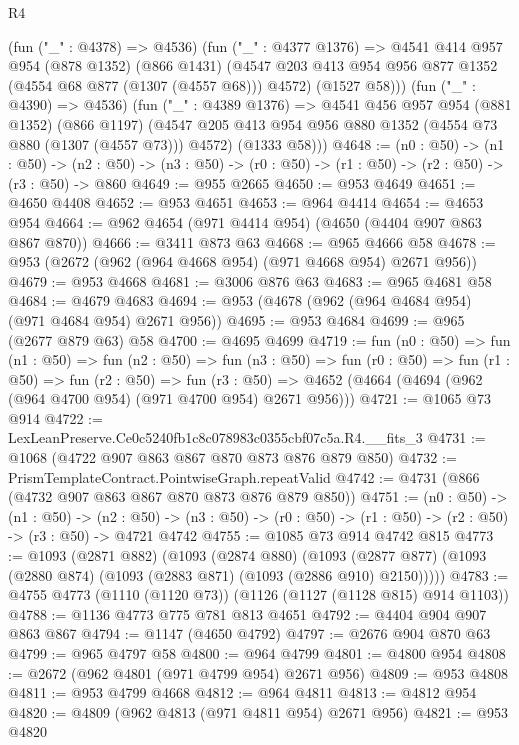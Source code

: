 \begin{lexlean}{R4}
\begin{coremodule}
        (fun ("_" : @4378) => @4536)
        (fun ("_" : @4377 @1376) =>
        @4541
          @414
          @957
          @954
          (@878 @1352)
          (@866 @1431)
          (@4547 @203 @413 @954 @956 @877 @1352 (@4554 @68 @877 (@1307 (@4557 @68))) @4572)
          (@1527 @58)))
      (fun ("_" : @4390) => @4536)
      (fun ("_" : @4389 @1376) =>
      @4541
        @456
        @957
        @954
        (@881 @1352)
        (@866 @1197)
        (@4547 @205 @413 @954 @956 @880 @1352 (@4554 @73 @880 (@1307 (@4557 @73))) @4572)
        (@1333 @58)))
@4648 := (n0 : @50) ->
  (n1 : @50) ->
  (n2 : @50) -> (n3 : @50) -> (r0 : @50) -> (r1 : @50) -> (r2 : @50) -> (r3 : @50) -> @860
@4649 := @955 @2665
@4650 := @953 @4649
@4651 := @4650 @4408
@4652 := @953 @4651
@4653 := @964 @4414
@4654 := @4653 @954
@4664 := @962 @4654 (@971 @4414 @954) (@4650 (@4404 @907 @863 @867 @870))
@4666 := @3411 @873 @63
@4668 := @965 @4666 @58
@4678 := @953 (@2672 (@962 (@964 @4668 @954) (@971 @4668 @954) @2671 @956))
@4679 := @953 @4668
@4681 := @3006 @876 @63
@4683 := @965 @4681 @58
@4684 := @4679 @4683
@4694 := @953 (@4678 (@962 (@964 @4684 @954) (@971 @4684 @954) @2671 @956))
@4695 := @953 @4684
@4699 := @965 (@2677 @879 @63) @58
@4700 := @4695 @4699
@4719 := fun (n0 : @50) =>
  fun (n1 : @50) =>
  fun (n2 : @50) =>
  fun (n3 : @50) =>
  fun (r0 : @50) =>
  fun (r1 : @50) =>
  fun (r2 : @50) =>
  fun (r3 : @50) => @4652 (@4664 (@4694 (@962 (@964 @4700 @954) (@971 @4700 @954) @2671 @956)))
@4721 := @1065 @73 @914
@4722 := LexLeanPreserve.Ce0c5240fb1c8c078983c0355cbf07c5a.R4.__fits_3
@4731 := @1068 (@4722 @907 @863 @867 @870 @873 @876 @879 @850)
@4732 := PrismTemplateContract.PointwiseGraph.repeatValid
@4742 := @4731 (@866 (@4732 @907 @863 @867 @870 @873 @876 @879 @850))
@4751 := (n0 : @50) ->
  (n1 : @50) ->
  (n2 : @50) -> (n3 : @50) -> (r0 : @50) -> (r1 : @50) -> (r2 : @50) -> (r3 : @50) -> @4721 @4742
@4755 := @1085 @73 @914 @4742 @815
@4773 := @1093
    (@2871 @882)
    (@1093
      (@2874 @880)
      (@1093 (@2877 @877) (@1093 (@2880 @874) (@1093 (@2883 @871) (@1093 (@2886 @910) @2150)))))
@4783 := @4755 @4773 (@1110 (@1120 @73)) (@1126 (@1127 (@1128 @815) @914 @1103))
@4788 := @1136 @4773 @775 @781 @813 @4651
@4792 := @4404 @904 @907 @863 @867
@4794 := @1147 (@4650 @4792)
@4797 := @2676 @904 @870 @63
@4799 := @965 @4797 @58
@4800 := @964 @4799
@4801 := @4800 @954
@4808 := @2672 (@962 @4801 (@971 @4799 @954) @2671 @956)
@4809 := @953 @4808
@4811 := @953 @4799 @4668
@4812 := @964 @4811
@4813 := @4812 @954
@4820 := @4809 (@962 @4813 (@971 @4811 @954) @2671 @956)
@4821 := @953 @4820

\end{coremodule}
\end{lexlean}
